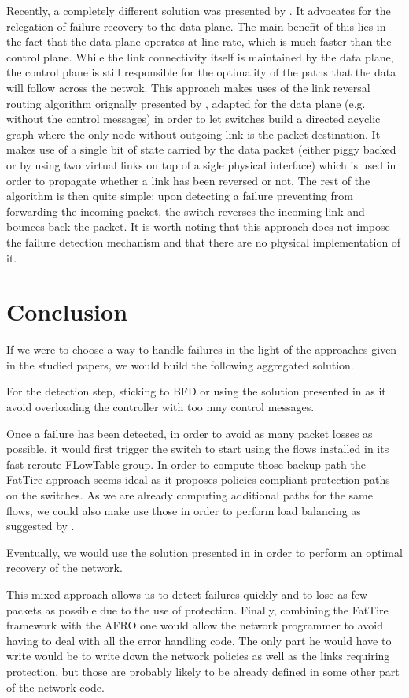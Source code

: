 \documentclass[]{IEEEtran}
\begin{document}
Recently, a completely different solution was presented by \cite{Liu:2013:ECV:2482626.2482639}. It advocates for the relegation of failure recovery to the data plane. The main benefit of this lies in the fact that the data plane operates at line rate, which is much faster than the control plane. While the link connectivity itself is maintained by the data plane, the control plane is still responsible for the optimality of the paths that the data will follow across the netwok. This approach makes uses of the link reversal routing algorithm orignally presented by \cite{1094876}, adapted for the data plane (e.g. without the control messages) in order to let switches build a directed acyclic graph where the only node without outgoing link is the packet destination. It makes use of a single bit of state carried by the data packet (either piggy backed or by using two virtual links on top of a sigle physical interface) which is used in order to propagate whether a link has been reversed or not. The rest of the algorithm is then quite simple: upon detecting a failure preventing from forwarding the incoming packet, the switch reverses the incoming link and bounces back the packet. It is worth noting that this approach does not impose the failure detection mechanism and that there are no physical implementation of it.

\section{Conclusion}
If we were to choose a way to handle failures in the light of the approaches given in the studied papers, we would build the following aggregated solution.

For the detection step, sticking to BFD or using the solution presented in \cite{6364688} as it avoid overloading the controller with too mny control messages.

Once a failure has been detected, in order to avoid as many packet losses as possible, it would first trigger the switch to start using the flows installed in its fast-reroute FLowTable group. In order to compute those backup path the FatTire approach seems ideal \cite{Reitblatt:2013:FDF:2491185.2491187} as it proposes policies-compliant protection paths on the switches. As we are already computing additional paths for the same flows, we could also make use those in order to perform load balancing as suggested by \cite{Suchara:2011:NAJ:1993744.1993756}.

Eventually, we would use the solution presented in \cite{Kuzniar:2013:AFR:2491185.2491218} in order to perform an optimal recovery of the network.

This mixed approach allows us to detect failures quickly and to lose as few packets as possible due to the use of protection. Finally, combining the FatTire framework with the AFRO one would allow the network programmer to avoid having to deal with all the error handling code. The only part he would have to write would be to write down the network policies as well as the links requiring protection, but those are probably likely to be already defined in some other part of the network code.


\nocite{*}

\end{document}
